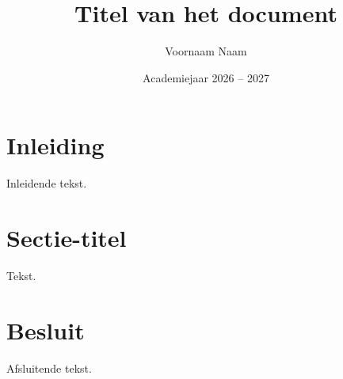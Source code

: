 \documentclass[kulak]{kulakarticle}
\title{Titel van het document}
\author{Voornaam Naam}
\date{Academiejaar 2026 -- 2027}
\begin{document}
\maketitle

\section*{Inleiding}

Inleidende tekst.

\section{Sectie-titel}

Tekst.

\section*{Besluit}

Afsluitende tekst.
\end{document}
